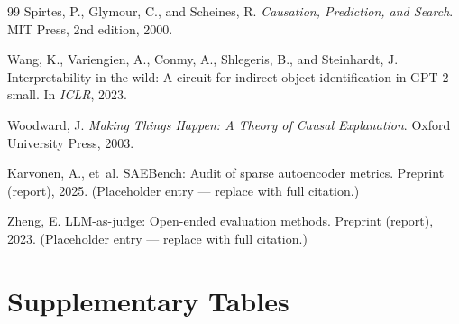 \documentclass[10pt]{article}
\begin{document}
\begin{thebibliography}{99}
Spirtes, P., Glymour, C., and Scheines, R.
\newblock \emph{Causation, Prediction, and Search}.
\newblock MIT Press, 2nd edition, 2000.

Wang, K., Variengien, A., Conmy, A., Shlegeris, B., and Steinhardt, J.
\newblock Interpretability in the wild: A circuit for indirect object identification in {GPT}-2 small.
\newblock In \emph{ICLR}, 2023.

Woodward, J.
\newblock \emph{Making Things Happen: A Theory of Causal Explanation}.
\newblock Oxford University Press, 2003.

Karvonen, A., et~al.
\newblock SAEBench: Audit of sparse autoencoder metrics.
\newblock Preprint (report), 2025. (Placeholder entry — replace with full citation.)

Zheng, E.
\newblock LLM-as-judge: Open-ended evaluation methods.
\newblock Preprint (report), 2023. (Placeholder entry — replace with full citation.)

\end{thebibliography}

\section{Supplementary Tables}
\label{app:supp-tables}
\end{document}

